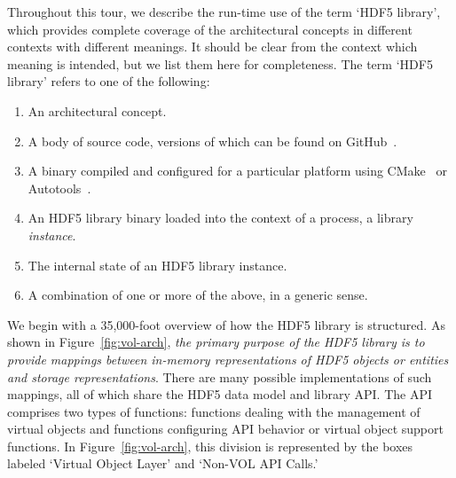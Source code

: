 



Throughout this tour, we describe the run-time use of the term `HDF5 library', which provides complete coverage of the architectural concepts in different contexts with different meanings. It should be clear from the context which meaning is intended, but we list them here for completeness. The term `HDF5 library' refers to one of the following:

\begin{enumerate}
    \item An architectural concept.
    \item A body of source code, versions of which can be found on GitHub~\cite{libhdf52023}.
    \item A binary compiled and configured for a particular platform using CMake~\cite{cmake2023} or Autotools~\cite{autotools2023}.
    \item An HDF5 library binary loaded into the context of a process, a library \textit{instance}.
    \item The internal state of an HDF5 library instance.
    \item A combination of one or more of the above, in a generic sense.
\end{enumerate}

We begin with a 35,000-foot overview of how the HDF5 library is structured. As shown in Figure~\ref{fig:vol-arch}, \textit{the primary purpose of the HDF5 library is to provide mappings between in-memory representations of HDF5 objects or entities and storage representations}. There are many possible implementations of such mappings, all of which share the HDF5 data model and library API. The API comprises two types of functions: functions dealing with the management of virtual objects and functions configuring API behavior or virtual object support functions. In Figure~\ref{fig:vol-arch}, this division is represented by the boxes labeled `Virtual Object Layer' and `Non-VOL API Calls.'

